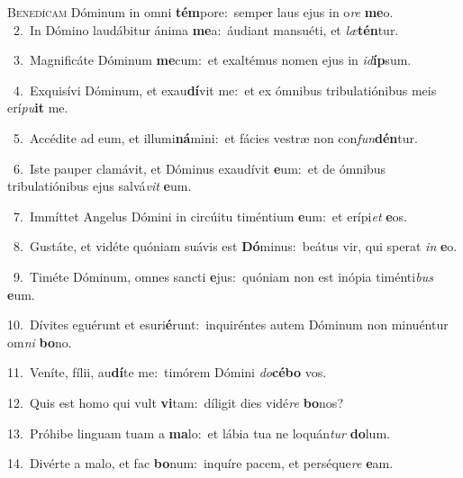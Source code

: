 \lettrine{\initial\textcolor{\initialcolor}{B}}{enedícam} Dóminum in omni \textbf{tém}\-pore:~\star semper laus ejus in o\textit{re} \textbf{me}\-o.\\
{\numbfont\textcolor{\numbcolor}{~2.}}~In Dómino laudábitur ánima \textbf{me}\-a:~\star áudiant mansuéti, et \textit{læ}\-\textbf{tén}tur.\par
{\numbfont\textcolor{\numbcolor}{~3.}}~Magnificáte Dóminum \textbf{me}\-cum:~\star et exaltémus nomen ejus in \textit{id}\-\textbf{íp}sum.\par
{\numbfont\textcolor{\numbcolor}{~4.}}~Exquisívi Dóminum, et exau\-\textbf{dí}\-vit me:~\star et ex ómnibus tribulatiónibus meis erí\-\textit{pu}\-\textbf{it} me.\par
{\numbfont\textcolor{\numbcolor}{~5.}}~Accédite ad eum, et illumi\-\textbf{ná}\-mini:~\star et fácies vestræ non con\-\textit{fun}\-\textbf{dén}tur.\par
{\numbfont\textcolor{\numbcolor}{~6.}}~Iste pauper clamávit, et Dóminus exaudívit \textbf{e}\-um:~\star et de ómnibus tribulatiónibus ejus salvá\textit{vit} \textbf{e}\-um.\par
{\numbfont\textcolor{\numbcolor}{~7.}}~Immíttet Angelus Dómini in circúitu timéntium \textbf{e}\-um:~\star et erípi\textit{et} \textbf{e}\-os.\par
{\numbfont\textcolor{\numbcolor}{~8.}}~Gustáte, et vidéte quóniam suávis est \textbf{Dó}\-minus:~\star beátus vir, qui sperat \textit{in} \textbf{e}\-o.\par
{\numbfont\textcolor{\numbcolor}{~9.}}~Timéte Dóminum, omnes sancti \textbf{e}\-jus:~\star quóniam non est inópia timénti\textit{bus} \textbf{e}\-um.\par
{\numbfont\textcolor{\numbcolor}{10.}}~Dívites eguérunt et esuri\-\textbf{é}\-runt:~\star inquiréntes autem Dóminum non minuéntur om\textit{ni} \textbf{bo}\-no.\par
{\numbfont\textcolor{\numbcolor}{11.}}~Veníte, fílii, au\-\textbf{dí}\-te me:~\star timórem Dómini \textit{do}\-\textbf{cé}\textbf{bo} vos.\par
{\numbfont\textcolor{\numbcolor}{12.}}~Quis est homo qui vult \textbf{vi}\-tam:~\star díligit dies vidé\textit{re} \textbf{bo}\-nos?\par
{\numbfont\textcolor{\numbcolor}{13.}}~Próhibe linguam tuam a \textbf{ma}\-lo:~\star et lábia tua ne loquán\textit{tur} \textbf{do}\-lum.\par
{\numbfont\textcolor{\numbcolor}{14.}}~Divérte a malo, et fac \textbf{bo}\-num:~\star inquíre pacem, et perséque\textit{re} \textbf{e}\-am.\par
